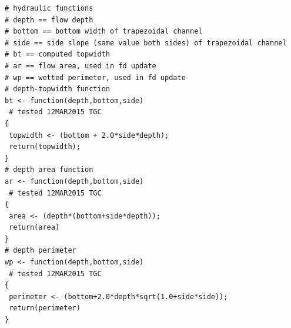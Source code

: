 \begin{lstlisting}[caption=R code for Hydraulic Elements for Example 1, label=lst:example1hyd]
# hydraulic functions
# depth == flow depth
# bottom == bottom width of trapezoidal channel
# side == side slope (same value both sides) of trapezoidal channel
# bt == computed topwidth
# ar == flow area, used in fd update
# wp == wetted perimeter, used in fd update
# depth-topwidth function
bt <- function(depth,bottom,side)
 # tested 12MAR2015 TGC
{
 topwidth <- (bottom + 2.0*side*depth);
 return(topwidth);
}
# depth area function
ar <- function(depth,bottom,side)
 # tested 12MAR2015 TGC
{
 area <- (depth*(bottom+side*depth));
 return(area)
}
# depth perimeter
wp <- function(depth,bottom,side)
 # tested 12MAR2015 TGC
{
 perimeter <- (bottom+2.0*depth*sqrt(1.0+side*side));
 return(perimeter)
}
\end{lstlisting}

